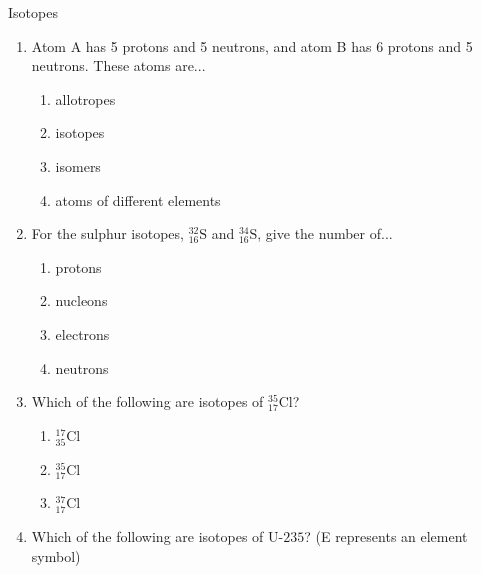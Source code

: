    \begin{exercises}  {Isotopes }
            \nopagebreak \noindent
        \label{m38753*id258162}\begin{enumerate}[noitemsep, label=\textbf{\arabic*}. ] 
            \label{m38753*uid50}\item Atom A has 5 protons and 5 neutrons, and atom B has 6 protons and 5 neutrons. These atoms are...
\label{m38753*id258178}\begin{enumerate}[noitemsep, label=\textbf{\alph*}. ] 
            \label{m38753*uid51}\item allotropes
\label{m38753*uid52}\item isotopes
\label{m38753*uid53}\item isomers
\label{m38753*uid54}\item atoms of different elements
\end{enumerate}
                \label{m38753*uid55}\item For the sulphur isotopes, $_{16}^{32}\text{S}$ and $_{16}^{34}\text{S}$, give the number of...
\label{m38753*id258277}\begin{enumerate}[noitemsep, label=\textbf{\alph*}. ] 
            \label{m38753*uid56}\item protons
\label{m38753*uid57}\item nucleons
\label{m38753*uid58}\item electrons
\label{m38753*uid59}\item neutrons
\end{enumerate}
                \label{m38753*uid60}\item Which of the following are isotopes of $_{17}^{35}\text{Cl}$?
\label{m38753*id258355}\begin{enumerate}[noitemsep, label=\textbf{\alph*}. ] 
            \label{m38753*uid61}\item $_{35}^{17}\text{Cl}$
\label{m38753*uid62}\item $_{17}^{35}\text{Cl}$
\label{m38753*uid63}\item $_{17}^{37}\text{Cl}$
\end{enumerate}
                \label{m38753*uid64}\item Which of the following are isotopes of $\text{U-}235$? (E represents an element symbol)

\end{enumerate}
\end{exercises}
